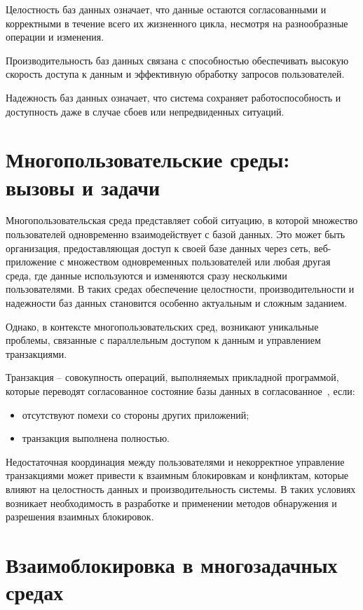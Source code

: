 Целостность баз данных означает, что данные остаются согласованными и корректными в течение всего их жизненного цикла, несмотря на разнообразные операции и изменения. 

Производительность баз данных связана с способностью обеспечивать высокую скорость доступа к данным и эффективную обработку запросов пользователей.

Надежность баз данных означает, что система сохраняет работоспособность и доступность даже в случае сбоев или непредвиденных ситуаций.

\section{Многопользовательские среды: вызовы и задачи}

Многопользовательская среда представляет собой ситуацию, в которой множество пользователей одновременно взаимодействует с базой данных. 
Это может быть организация, предоставляющая доступ к своей базе данных через сеть, веб-приложение с множеством одновременных пользователей или любая другая среда, где данные используются и изменяются сразу несколькими пользователями. 
В таких средах обеспечение целостности, производительности и надежности баз данных становится особенно актуальным и сложным заданием.

Однако, в контексте многопользовательских сред, возникают уникальные проблемы, связанные с параллельным доступом к данным и управлением транзакциями. 

Транзакция -- совокупность операций, выполняемых прикладной программой, которые переводят согласованное состояние базы данных в согласованное~\cite{transaction}, если:

\begin{itemize}
	\item отсутствуют помехи со стороны других приложений;
	\item транзакция выполнена полностью.
\end{itemize}

\sloppy

Недостаточная координация между пользователями и некорректное управление транзакциями может привести к взаимным блокировкам и конфликтам, которые влияют на целостность данных и производительность системы. 
В таких условиях возникает необходимость в разработке и применении методов обнаружения и разрешения взаимных блокировок.

\clearpage

\section{Взаимоблокировка в многозадачных\\средах}

